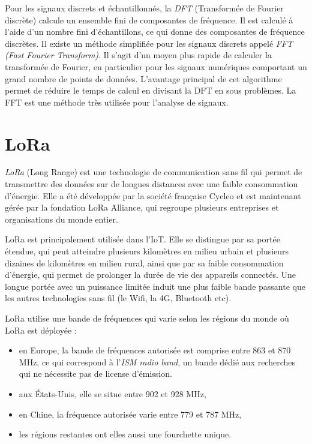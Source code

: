 \vspace{0.1cm}

Pour les signaux discrets et échantillonnés, la \textit{DFT} (Transformée de Fourier discrète) calcule un ensemble fini de composantes de fréquence. Il est calculé à l’aide d’un nombre fini d’échantillons, ce qui donne des composantes de fréquence discrètes. Il existe un méthode simplifiée pour les signaux discrets appelé \textit{FFT (Fast Fourier Transform)}\cite{fft}. Il s'agit d'un moyen plus rapide de calculer la transformée de Fourier, en particulier pour les signaux numériques comportant un grand nombre de points de données. L'avantage principal de cet algorithme permet de réduire le temps de calcul en divisant la DFT en sous problèmes. La FFT est une méthode très utilisée pour l'analyse de signaux.

\newpage

\section{LoRa}

\textit{LoRa} (Long Range) est une technologie de communication sans fil qui permet de transmettre des données sur de longues distances avec une faible consommation d'énergie. Elle a été développée par la société française Cycleo et est maintenant gérée par la fondation LoRa Alliance, qui regroupe plusieurs entreprises et organisations du monde entier.

\vspace{0.1cm}

LoRa est principalement utilisée dans l'IoT. Elle se distingue par sa portée étendue, qui peut atteindre plusieurs kilomètres en milieu urbain et plusieurs dizaines de kilomètres en milieu rural, ainsi que par sa faible consommation d'énergie, qui permet de prolonger la durée de vie des appareils connectés. Une longue portée avec un puissance limitée induit une plus faible bande passante que les autres technologies sans fil (le Wifi, la 4G, Bluetooth etc).

\vspace{0.1cm}

LoRa utilise une bande de fréquences qui varie selon les régions du monde où LoRa est déployée :

\vspace{0.1cm}

\begin{itemize}
\item en Europe, la bande de fréquences autorisée est comprise entre 863 et 870 MHz, ce qui correspond à l'\textit{ISM radio band}, un bande dédié aux recherches qui ne nécessite pas de license d'émission.
\item aux États-Unis, elle se situe entre 902 et 928 MHz,
\item en Chine, la fréquence autorisée varie entre 779 et 787 MHz,
\item les régions restantes ont elles aussi une fourchette unique.
\end{itemize}

